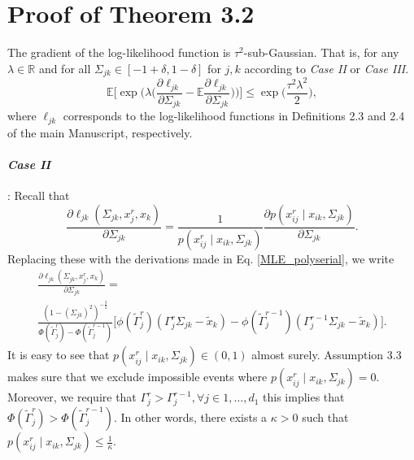 \section{Proof of Theorem 3.2
 }\label{proof_convergence}

\begin{condition}\label{Gradient statistical noise}
    The gradient of the log-likelihood function is $\tau^2$-sub-Gaussian. That is, for any $\lambda \in \mathbb{R}$ and for all $\Sigma_{jk} \in [-1+\delta, 1-\delta]$ for $j,k$ according to \textit{Case II} or \textit{Case III}.
    \begin{equation}
        \mathbb{E}\Bigg[\exp\Bigg(\lambda \Big(\frac{\partial\ell_{jk}}{\partial \Sigma_{jk}} - \mathbb{E}\frac{\partial\ell_{jk}}{\partial \Sigma_{jk}} \Big) \Bigg)\Bigg] \leq \exp\Big(\frac{\tau^2\lambda^2}{2}\Big),
    \end{equation}
    where $\ell_{jk}$ corresponds to the log-likelihood functions in Definitions 2.3 and 2.4 of the main Manuscript, respectively.
    \paragraph{\textit{Case II}}: Recall that
    \begin{equation*}
        \frac{\partial\ell_{jk}(\Sigma_{jk}, x_j^r,x_k)}{\partial \Sigma_{jk}} = \frac{1}{p(x_{ij}^{r} \mid x_{ik}, \Sigma_{jk})} \frac{\partial p(x_{ij}^{r} \mid x_{ik}, \Sigma_{jk})}{\partial \Sigma_{jk}}.
    \end{equation*}
    Replacing these with the derivations made in Eq. \eqref{MLE_polyserial}, we write
    \begin{multline*}
        \frac{\partial\ell_{jk}(\Sigma_{jk}, x_j^r,x_k)}{\partial \Sigma_{jk}} = \\
        \frac{(1-(\Sigma_{jk})^2)^{-\frac{3}{2}}}{\Phi({\tilde{\Gamma}}_j^{r}) - \Phi({\tilde{\Gamma}}_j^{r-1})} \Bigg[\phi({\tilde{\Gamma}}_j^{r})({\Gamma}_j^r\Sigma_{jk} - {\tilde{x}}_{k}) - \phi({\tilde{\Gamma}}_j^{r-1})({\Gamma}_j^{r-1}\Sigma_{jk} - {\tilde{x}}_{k})\Bigg].
    \end{multline*}
    It is easy to see that $p(x_{ij}^{r} \mid x_{ik}, \Sigma_{jk}) \in (0,1)$ almost surely. Assumption 3.3
    makes sure that we exclude impossible events where $p(x_{ij}^{r} \mid x_{ik}, \Sigma_{jk}) = 0$. Moreover, we require that $\Gamma_j^r > \Gamma_j^{r-1}, \forall j \in 1, \dots, d_1$ this implies that $\Phi({\tilde{\Gamma}}_j^{r}) > \Phi({\tilde{\Gamma}}_j^{r-1})$. In other words, there exists a $\kappa >0$ such that $p(x_{ij}^{r} \mid x_{ik}, \Sigma_{jk}) \leq \frac{1}{\kappa}$.


\end{condition}
